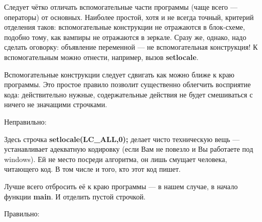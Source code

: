 \begin{notbadadvice}
	\label{NA_aux-to-border}
	Следует чётко отличать вспомогательные части программы (чаще всего --- операторы) от основных.
	Наиболее простой, хотя и не всегда точный, критерий отделения таков:
	вспомогательные конструкции не отражаются в блок-схеме, подобно тому,
	как вампиры не отражаются в зеркале.
	Сразу же, однако, надо сделать оговорку: объявление переменной --- не вспомогательная конструкция!
	К вспомогательным можно отнести, например, вызов \textbf{setlocale}.

	Вспомогательные конструкции следует сдвигать как можно ближе к краю программы.
	Это простое правило позволит существенно облегчить восприятие кода:
	действительно нужные, содержательные действия не будет смешиваться с ничего не значащими строчками.

	Неправильно:

	Здесь строчка \textbf{setlocale(LC\_ALL,0);} делает чисто техническую вещь ---
	устанавливает адекватную кодировку (если Вам не повезло и Вы работаете под windows).
	Ей не место посреди алгоритма, он лишь смущает человека, читающего код.
	В том числе и того, кто этот код пишет.

	Лучше всего отбросить её к краю программы --- в нашем случае, в начало функции \textbf{main}.
	И отделить пустой строчкой.

	Правильно:

\end{notbadadvice}
